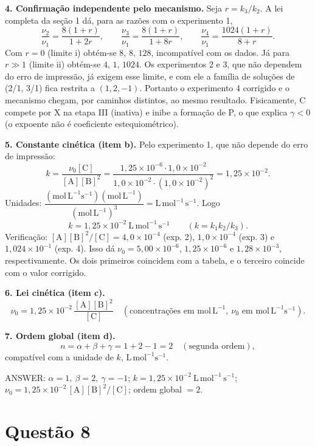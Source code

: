\documentclass{article}%
\begin{document}
\textbf{4. Confirmação independente pelo mecanismo.} Seja $r=k_3/k_2$. A lei completa da seção 1 dá, para as razões com o experimento 1,
\[
\frac{\nu_2}{\nu_1}=\frac{8(1+r)}{1+2r},\qquad
\frac{\nu_3}{\nu_1}=\frac{8(1+r)}{1+8r},\qquad
\frac{\nu_4}{\nu_1}=\frac{1024(1+r)}{8+r}.
\]
Com $r=0$ (limite i) obtém-se $8,\,8,\,128$, incompatível com os dados. Já para $r\gg1$ (limite ii) obtém-se $4,\,1,\,1024$. Os experimentos 2 e 3, que não dependem do erro de impressão, já exigem esse limite, e com ele a família de soluções de (2/1, 3/1) fica restrita a $(1,2,-1)$. Portanto o experimento 4 corrigido e o mecanismo chegam, por caminhos distintos, ao mesmo resultado. Fisicamente, C compete por X na etapa III (inativa) e inibe a formação de P, o que explica $\gamma<0$ (o expoente não é coeficiente estequiométrico).

\textbf{5. Constante cinética (item b).} Pelo experimento 1, que não depende do erro de impressão:
\[
k=\frac{\nu_0[\mathrm{C}]}{[\mathrm{A}][\mathrm{B}]^2}
=\frac{1{,}25\times10^{-6}\cdot1{,}0\times10^{-2}}{1{,}0\times10^{-2}\cdot(1{,}0\times10^{-2})^2}
=1{,}25\times10^{-2}.
\]
Unidades: $\dfrac{(\mathrm{mol\,L^{-1}s^{-1}})(\mathrm{mol\,L^{-1}})}{(\mathrm{mol\,L^{-1}})^{3}}=\mathrm{L\,mol^{-1}\,s^{-1}}$. Logo
\[
\boxed{k=1{,}25\times10^{-2}\ \mathrm{L\,mol^{-1}\,s^{-1}}}\qquad(k=k_1k_2/k_3).
\]
Verificação: $[\mathrm{A}][\mathrm{B}]^2/[\mathrm{C}]=4{,}0\times10^{-4}$ (exp. 2), $1{,}0\times10^{-4}$ (exp. 3) e $1{,}024\times10^{-1}$ (exp. 4). Isso dá $\nu_0=5{,}00\times10^{-6}$, $1{,}25\times10^{-6}$ e $1{,}28\times10^{-3}$, respectivamente. Os dois primeiros coincidem com a tabela, e o terceiro coincide com o valor corrigido.

\textbf{6. Lei cinética (item c).}
\[
\boxed{\nu_0=1{,}25\times10^{-2}\,\frac{[\mathrm{A}][\mathrm{B}]^{2}}{[\mathrm{C}]}}
\quad(\text{concentrações em }\mathrm{mol\,L^{-1}},\ \nu_0\text{ em }\mathrm{mol\,L^{-1}s^{-1}}).
\]

\textbf{7. Ordem global (item d).}
\[
n=\alpha+\beta+\gamma=1+2-1=2\quad(\text{segunda ordem}),
\]
compatível com a unidade de $k$, $\mathrm{L\,mol^{-1}s^{-1}}$.

ANSWER: $\alpha=1,\ \beta=2,\ \gamma=-1$; $k=1{,}25\times10^{-2}\ \mathrm{L\,mol^{-1}\,s^{-1}}$; $\nu_0=1{,}25\times10^{-2}\,[\mathrm{A}][\mathrm{B}]^2/[\mathrm{C}]$; ordem global $=2$.%
\newpage%
\section*{Questão 8}
\end{document}
